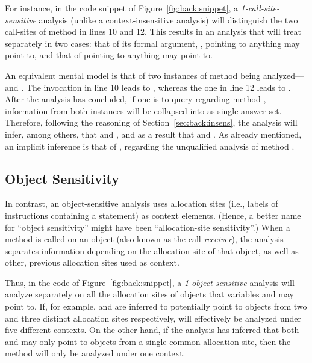 For instance, in the code snippet of Figure~\ref{fig:back:snippet}, a \emph{1-call-site-sensitive} analysis (unlike a context-insensitive analysis) will distinguish the two call-sites of method  in lines 10 and 12. This results in an analysis that will treat  separately in two cases: that of its formal argument, , pointing to anything  may point to, and that of  pointing to anything  may point to.

An equivalent mental model is that of two instances of method  being analyzed--- and . The invocation in line 10 leads to , whereas the one in line 12 leads to . After the analysis has concluded, if one is to query regarding method , information from both instances will be collapsed into as single answer-set. Therefore, following the reasoning of Section~\ref{sec:back:insens}, the analysis will infer, among others, that  and , and as a result that  and . As already mentioned, an implicit inference is that of , regarding the unqualified analysis of method .


\subsection{Object Sensitivity}

In contrast, an object-sensitive analysis uses allocation sites (i.e., labels of instructions containing a  statement) as context elements. (Hence, a better name for ``object sensitivity'' might have been ``allocation-site sensitivity''.) When a method is called on an object (also known as the call \emph{receiver}), the analysis separates information depending on the allocation site of that object, as well as other, previous allocation sites used as context.

Thus, in the code of Figure~\ref{fig:back:snippet}, a \emph{1-object-sensitive} analysis will analyze  separately on all the allocation sites of objects that variables  and  may point to. If, for example,  and  are inferred to potentially point to objects from two and three distinct allocation sites respectively,  will effectively be analyzed under five different contexts. On the other hand, if the analysis has inferred that both  and  may only point to objects from a single common allocation site, then the method will only be analyzed under one context.

